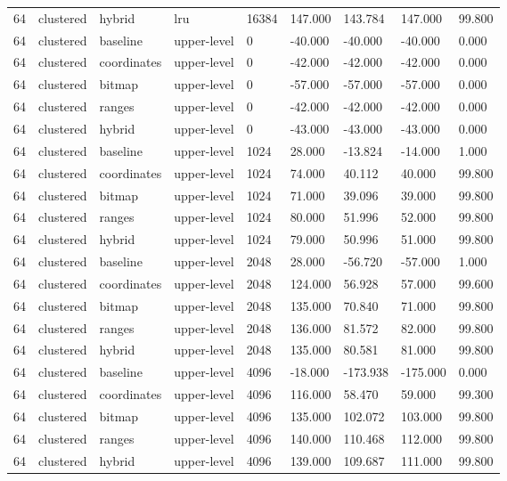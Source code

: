 \begin{tabular}{lllllllll}
64 & clustered & hybrid & lru & 16384 & 147.000 & 143.784 & 147.000 & 99.800 \\
64 & clustered & baseline & upper-level & 0 & -40.000 & -40.000 & -40.000 & 0.000 \\
64 & clustered & coordinates & upper-level & 0 & -42.000 & -42.000 & -42.000 & 0.000 \\
64 & clustered & bitmap & upper-level & 0 & -57.000 & -57.000 & -57.000 & 0.000 \\
64 & clustered & ranges & upper-level & 0 & -42.000 & -42.000 & -42.000 & 0.000 \\
64 & clustered & hybrid & upper-level & 0 & -43.000 & -43.000 & -43.000 & 0.000 \\
64 & clustered & baseline & upper-level & 1024 & 28.000 & -13.824 & -14.000 & 1.000 \\
64 & clustered & coordinates & upper-level & 1024 & 74.000 & 40.112 & 40.000 & 99.800 \\
64 & clustered & bitmap & upper-level & 1024 & 71.000 & 39.096 & 39.000 & 99.800 \\
64 & clustered & ranges & upper-level & 1024 & 80.000 & 51.996 & 52.000 & 99.800 \\
64 & clustered & hybrid & upper-level & 1024 & 79.000 & 50.996 & 51.000 & 99.800 \\
64 & clustered & baseline & upper-level & 2048 & 28.000 & -56.720 & -57.000 & 1.000 \\
64 & clustered & coordinates & upper-level & 2048 & 124.000 & 56.928 & 57.000 & 99.600 \\
64 & clustered & bitmap & upper-level & 2048 & 135.000 & 70.840 & 71.000 & 99.800 \\
64 & clustered & ranges & upper-level & 2048 & 136.000 & 81.572 & 82.000 & 99.800 \\
64 & clustered & hybrid & upper-level & 2048 & 135.000 & 80.581 & 81.000 & 99.800 \\
64 & clustered & baseline & upper-level & 4096 & -18.000 & -173.938 & -175.000 & 0.000 \\
64 & clustered & coordinates & upper-level & 4096 & 116.000 & 58.470 & 59.000 & 99.300 \\
64 & clustered & bitmap & upper-level & 4096 & 135.000 & 102.072 & 103.000 & 99.800 \\
64 & clustered & ranges & upper-level & 4096 & 140.000 & 110.468 & 112.000 & 99.800 \\
64 & clustered & hybrid & upper-level & 4096 & 139.000 & 109.687 & 111.000 & 99.800 \\

\end{tabular}
